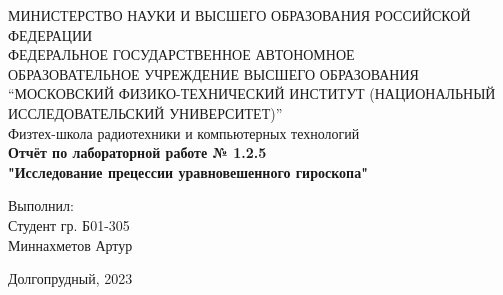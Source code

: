\begin{center}
МИНИСТЕРСТВО НАУКИ И ВЫСШЕГО ОБРАЗОВАНИЯ РОССИЙСКОЙ ФЕДЕРАЦИИ\\
\hfill \break
ФЕДЕРАЛЬНОЕ ГОСУДАРСТВЕННОЕ АВТОНОМНОЕ \\ ОБРАЗОВАТЕЛЬНОЕ УЧРЕЖДЕНИЕ ВЫСШЕГО ОБРАЗОВАНИЯ \\
“МОСКОВСКИЙ ФИЗИКО-ТЕХНИЧЕСКИЙ ИНСТИТУТ (НАЦИОНАЛЬНЫЙ ИССЛЕДОВАТЕЛЬСКИЙ УНИВЕРСИТЕТ)” \\

\hfill \break
Физтех-школа радиотехники и компьютерных технологий\\
\vspace{2.5cm}
\large{\textbf{Отчёт по лабораторной работе № 1.2.5}}\\
\large{\textbf{"Исследование прецессии уравновешенного гироскопа"}}\\
\hfill \break
\end{center}

\vspace{5cm}

\begin{flushright}
Выполнил:\\
Студент гр. Б01-305\\
Миннахметов Артур\\
\end{flushright}

\vfill


\begin{center} Долгопрудный, 2023 \end{center}

\thispagestyle{empty}
\newpage
